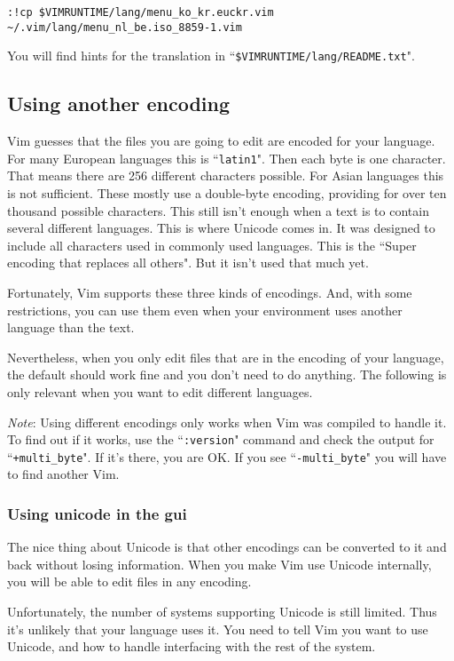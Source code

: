 \begin{Verbatim}[samepage=true]
 :!cp $VIMRUNTIME/lang/menu_ko_kr.euckr.vim ~/.vim/lang/menu_nl_be.iso_8859-1.vim
\end{Verbatim}

You will find hints for the translation in ``\texttt{\$VIMRUNTIME/lang/README.txt}".
\subsection{Using another encoding}
Vim guesses that the files you are going to edit are encoded for your language.
For many European languages this is ``\texttt{latin1}".
Then each byte is one character.
That means there are 256 different characters possible.
For Asian languages this is not sufficient.
These mostly use a double-byte encoding, providing for over ten thousand possible characters.
This still isn't enough when a text is to contain several different languages.
This is where Unicode comes in.
It was designed to include all characters used in commonly used languages.
This is the ``Super encoding that replaces all others".
But it isn't used that much yet.

Fortunately, Vim supports these three kinds of encodings.
And, with some restrictions, you can use them even when your environment uses another language than the text.

Nevertheless, when you only edit files that are in the encoding of your language, the default should work fine and you don't need to do anything.
The following is only relevant when you want to edit different languages.

\emph{Note}:
Using different encodings only works when Vim was compiled to handle it.
To find out if it works, use the ``\texttt{:version}" command and check the output for ``\texttt{+multi\_byte}".
If it's there, you are OK.
If you see ``\texttt{-multi\_byte}" you will have to find another Vim.

\subsubsection{Using unicode in the gui}
The nice thing about Unicode is that other encodings can be converted to it and back without losing information.
When you make Vim use Unicode internally, you will be able to edit files in any encoding.

Unfortunately, the number of systems supporting Unicode is still limited.
Thus it's unlikely that your language uses it.
You need to tell Vim you want to use Unicode, and how to handle interfacing with the rest of the system.

